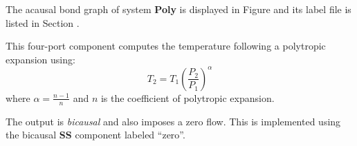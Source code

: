 

   The acausal bond graph of system \textbf{Poly} is
   displayed in Figure  and its label
   file is listed in Section .

This four-port component computes the temperature following a
polytropic expansion using:
\begin{equation}
  T_2 = T_1 \left ( \frac{P_2}{P_1} \right )^\alpha
\end{equation}
where $\alpha = \frac{n-1}{n}$ and $n$ is the coefficient of
polytropic expansion.

The output is \emph{bicausal} and also imposes a zero flow. This is
implemented using the bicausal \textbf{SS} component labeled ``zero''.

